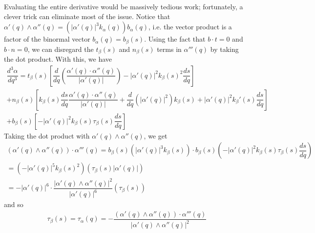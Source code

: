 \documentclass{article}
\begin{document}
	Evaluating the entire derivative would be massively tedious work; fortunately, a clever trick can eliminate most of the issue. Notice that $\alpha'(q) \wedge \alpha''(q) = \left( |\alpha'(q)|^3 k_{\alpha}(q) \right) b_{\alpha}(q)$, i.e. the vector product is a factor of the binormal vector $b_{\alpha}(q) = b_{\beta}(s)$. Using the fact that $b \cdot t = 0$ and $b \cdot n = 0$, we can disregard the $t_{\beta}(s)$ and $n_{\beta}(s)$ terms in $\alpha'''(q)$ by taking the dot product. With this, we have
	\begin{gather*}
		\dfrac{d^3\alpha}{dq^3} = t_{\beta}(s) \left[ \dfrac{d}{dq} \left( \dfrac{\alpha'(q) \cdot \alpha''(q)}{|\alpha'(q)|} \right) - |\alpha'(q)|^2 k_{\beta}(s)^2 \dfrac{ds}{dq} \right] \\
		+ n_{\beta}(s) \left[ k_{\beta}(s) \dfrac{ds}{dq} \dfrac{\alpha'(q) \cdot \alpha''(q)}{|\alpha'(q)|} + \dfrac{d}{dq} \left( |\alpha'(q)|^2 \right) k_{\beta}(s) + |\alpha'(q)|^2 k_{\beta}'(s) \dfrac{ds}{dq} \right] \\
		+ b_{\beta}(s) \left[ - |\alpha'(q)|^2 k_{\beta}(s) \tau_{\beta}(s) \dfrac{ds}{dq} \right]
	\end{gather*}
	Taking the dot product with $\alpha'(q) \wedge \alpha''(q)$, we get
	\begin{gather*}
		\left( \alpha'(q) \wedge \alpha''(q) \right) \cdot \alpha'''(q) 
		= b_{\beta}(s) \left( |\alpha'(q)|^3 k_{\beta}(s) \right) \cdot b_{\beta}(s) \left( - |\alpha'(q)|^2 k_{\beta}(s) \tau_{\beta}(s) \dfrac{ds}{dq} \right) \\
		= \left( -|\alpha'(q)|^5 k_{\beta}(s)^2 \right)  \left( \tau_{\beta}(s) |\alpha'(q)| \right) \\
		= -|\alpha'(q)|^6 \cdot \dfrac{|\alpha'(q) \wedge \alpha''(q)|^2 }{|\alpha'(q)|^6} \left( \tau_{\beta}(s) \right)
	\end{gather*}
	and so
	\begin{gather*}
		\tau_{\beta}(s) = \tau_{\alpha}(q) = -\dfrac{\left( \alpha'(q) \wedge \alpha''(q) \right) \cdot \alpha'''(q) }{|\alpha'(q) \wedge \alpha''(q)|^2}
	\end{gather*}
	
\end{document}
